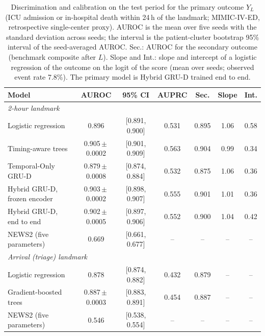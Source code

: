 \begin{table}[t]
\centering
\caption{Discrimination and calibration on the test period for the primary outcome $Y_L$ (ICU admission or in-hospital death within 24\,h of the landmark; MIMIC-IV-ED, retrospective single-center proxy). AUROC is the mean over five seeds with the standard deviation across seeds; the interval is the patient-cluster bootstrap 95\% interval of the seed-averaged AUROC. Sec.: AUROC for the secondary outcome (benchmark composite after $L$). Slope and Int.: slope and intercept of a logistic regression of the outcome on the logit of the score (mean over seeds; observed event rate 7.8\%). The primary model is Hybrid GRU-D trained end to end.}
\label{tab:discrimination}
\begin{tabular}{lcccccc}
\toprule
Model & AUROC & 95\% CI & AUPRC & Sec. & Slope & Int. \\
\midrule
\multicolumn{7}{l}{\emph{2-hour landmark}} \\
Logistic regression & 0.896 & [0.891, 0.900] & 0.531 & 0.895 & 1.06 & 0.58 \\
Timing-aware trees & 0.905\,$\pm$\,0.0002 & [0.901, 0.909] & 0.563 & 0.904 & 0.99 & 0.34 \\
Temporal-Only GRU-D & 0.879\,$\pm$\,0.0008 & [0.874, 0.884] & 0.532 & 0.875 & 1.06 & 0.36 \\
Hybrid GRU-D, frozen encoder & 0.903\,$\pm$\,0.0002 & [0.898, 0.907] & 0.555 & 0.901 & 1.01 & 0.36 \\
Hybrid GRU-D, end to end & 0.902\,$\pm$\,0.0005 & [0.897, 0.906] & 0.552 & 0.900 & 1.04 & 0.42 \\
NEWS2 (five parameters) & 0.669 & [0.661, 0.677] & -- & -- & -- & -- \\
\midrule
\multicolumn{7}{l}{\emph{Arrival (triage) landmark}} \\
Logistic regression & 0.878 & [0.874, 0.882] & 0.432 & 0.879 & -- & -- \\
Gradient-boosted trees & 0.887\,$\pm$\,0.0003 & [0.883, 0.891] & 0.454 & 0.887 & -- & -- \\
NEWS2 (five parameters) & 0.546 & [0.538, 0.554] & -- & -- & -- & -- \\
\bottomrule
\end{tabular}
\end{table}
